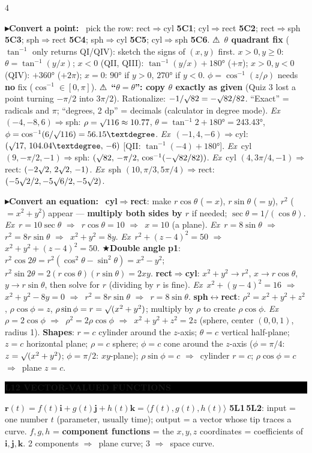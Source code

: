 \documentclass{article}
\newcommand\vb[1]{\symbf{#1}}                 %
\newcommand\ip[1]{\langle #1\rangle}          %
\newcommand\sh[1]{{\setlength\fboxsep{0.18pt}\colorbox{black!22}{\textbf{#1}}}} %
\newcommand\hd[1]{\par\vspace{0.5pt}\needspace{4\baselineskip}\noindent
  {\setlength\fboxsep{0.45pt}\colorbox{black}{\parbox{\dimexpr\linewidth-2\fboxsep}{\color{white}\bfseries #1}}}\par\nobreak\vspace{0.2pt}\nobreak}
\newcommand\pt[1]{\par\textbf{{\symf ▸}#1}\ }  %
\newcommand\ex{\textit{Ex}\ }                  %
\newcommand\warn{{\symf ⚠}}                    %
\newcommand\shc{{\symf ★}}                      %
\newcommand\rt{\smash{\surd}}               %
\newcommand\then{\ensuremath{\Rightarrow}}
\begin{document}
\begin{multicols*}{4}
\pt{Convert a point:} pick the row: rect\then cyl \sh{5C1}; cyl\then rect \sh{5C2}; rect\then sph \sh{5C3}; sph\then rect \sh{5C4}; sph\then cyl \sh{5C5}; cyl\then sph \sh{5C6}. \warn\ \textbf{$\theta$ quadrant fix} ($\tan^{-1}$ only returns QI/QIV): sketch the signs of $(x,y)$ first. $x>0,y\ge0$: $\theta=\tan^{-1}(y/x)$; \textbf{$x<0$} (QII, QIII): $\tan^{-1}(y/x)+180°$ ($+\pi$); $x>0,y<0$ (QIV): $+360°$ ($+2\pi$); $x=0$: $90°$ if $y>0$, $270°$ if $y<0$. $\phi=\cos^{-1}(z/\rho)$ needs \textbf{no} fix ($\cos^{-1}\in[0,\pi]$). \warn\ \textbf{``$\theta=\theta$'': copy $\theta$ exactly as given} (Quiz 3 lost a point turning $-\pi/2$ into $3\pi/2$). Rationalize: $-1/\rt82=-\rt82/82$. ``Exact'' = radicals and $\pi$; ``degrees, 2 dp'' = decimals (calculator in degree mode). \ex $(-4,-8,6)$\then sph: $\rho=\rt116\approx10.77$, $\theta=\tan^{-1}2+180°=243.43°$, $\phi=\cos^{-1}(6/\rt116)=56.15°$. \ex $(-1,4,-6)$\then cyl: $(\rt17,\,104.04°,\,-6)$ [QII: $\tan^{-1}(-4)+180°$]. \ex cyl $(9,-\pi/2,-1)$\then sph: $(\rt82,\,-\pi/2,\,\cos^{-1}(-\rt82/82))$. \ex cyl $(4,3\pi/4,-1)$\then rect: $(-2\rt2,\,2\rt2,\,-1)$. \ex sph $(10,\pi/3,5\pi/4)$\then rect: $(-5\rt2/2,-5\rt6/2,-5\rt2)$.

\pt{Convert an equation:} \textbf{cyl\then rect}: make $r\cos\theta$ ($=x$), $r\sin\theta$ ($=y$), $r^2$ ($=x^2+y^2$) appear — \textbf{multiply both sides by $r$} if needed; $\sec\theta=1/(\cos\theta)$. \ex $r=10\sec\theta$ \then\ $r\cos\theta=10$ \then\ $x=10$ (a plane). \ex $r=8\sin\theta$ \then\ $r^2=8r\sin\theta$ \then\ $x^2+y^2=8y$. \ex $r^2+(z-4)^2=50$ \then\ $x^2+y^2+(z-4)^2=50$. \shc \textbf{Double angle} \sh{p1}: $r^2\cos2\theta=r^2(\cos^2\theta-\sin^2\theta)=x^2-y^2$; $r^2\sin2\theta=2(r\cos\theta)(r\sin\theta)=2xy$. \textbf{rect\then cyl}: $x^2+y^2\to r^2$, $x\to r\cos\theta$, $y\to r\sin\theta$, then solve for $r$ (dividing by $r$ is fine). \ex $x^2+(y-4)^2=16$ \then\ $x^2+y^2-8y=0$ \then\ $r^2=8r\sin\theta$ \then\ $r=8\sin\theta$. \textbf{sph$\leftrightarrow$rect}: $\rho^2=x^2+y^2+z^2$, $\rho\cos\phi=z$, $\rho\sin\phi=r=\rt(x^2+y^2)$; multiply by $\rho$ to create $\rho\cos\phi$. \ex $\rho=2\cos\phi$ \then\ $\rho^2=2\rho\cos\phi$ \then\ $x^2+y^2+z^2=2z$ (sphere, center $(0,0,1)$, radius 1). \textbf{Shapes}: $r=c$ cylinder around the $z$-axis; $\theta=c$ vertical half-plane; $z=c$ horizontal plane; $\rho=c$ sphere; $\phi=c$ cone around the $z$-axis ($\phi=\pi/4$: $z=\rt(x^2+y^2)$; $\phi=\pi/2$: $xy$-plane); $\rho\sin\phi=c$ \then\ cylinder $r=c$; $\rho\cos\phi=c$ \then\ plane $z=c$.

\hd{L12 VECTOR-VALUED FUNCTIONS}
$\vb r(t)=f(t)\vb i+g(t)\vb j+h(t)\vb k=\ip{f(t),g(t),h(t)}$ \sh{5L1}\,\sh{5L2}: input = one number $t$ (parameter, usually time); output = a vector whose tip traces a curve. $f,g,h$ = \textbf{component functions} = the $x,y,z$ coordinates = coefficients of $\vb i,\vb j,\vb k$. 2 components \then\ plane curve; 3 \then\ space curve.


\end{multicols*}
\end{document}
